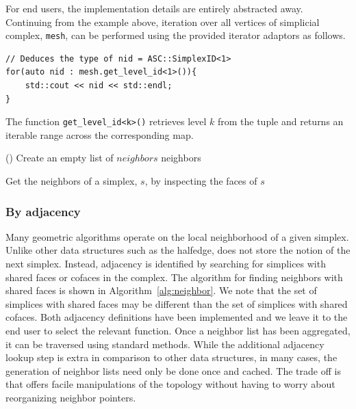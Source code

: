 		\par For end users, the implementation details are entirely abstracted away. Continuing from the example above, iteration over all vertices of simplicial complex, \verb|mesh|, can be performed using the provided iterator adaptors as follows.
\begin{lstlisting}[caption={Example use of iterator adaptors for traversal across vertices of mesh.},captionpos=b]
// Deduces the type of nid = ASC::SimplexID<1>
for(auto nid : mesh.get_level_id<1>()){
	std::cout << nid << std::endl;
}
\end{lstlisting}
		The function \verb|get_level_id<k>()| retrieves level $k$ from the tuple and returns an iterable range across the corresponding map.

\begin{algorithm}[ht!]


\SetStartEndCondition{ (}{)}{)}
\AlgoDisplayBlockMarkers\AlgoDisplayGroupMarkers\SetAlgoBlockMarkers{ \{}{ \}\ }%
\SetAlgoNoEnd\SetAlgoNoLine\DontPrintSemicolon
\SetStartEndCondition{ (}{)}{)}

\medskip
\Fn(){}{
	Create an empty list of $neighbors$\;
	\Return neighbors
}

\caption{Get the neighbors of a simplex, $s$, by inspecting the faces of $s$}
\label{alg:neighbor}
\end{algorithm}
	\subsubsection{By adjacency}
		\par Many geometric algorithms operate on the local neighborhood of a given simplex. Unlike other data structures such as the halfedge, \asc does not store the notion of the next simplex. Instead, adjacency is identified by searching for simplices with shared faces or cofaces in the complex. The algorithm for finding neighbors with shared faces is shown in Algorithm~\ref{alg:neighbor}. We note that the set of simplices with shared faces may be different than the set of simplices with shared cofaces. Both adjacency definitions have been implemented and we leave it to the end user to select the relevant function. Once a neighbor list has been aggregated, it can be traversed using standard methods. While the additional adjacency lookup step is extra in comparison to other data structures, in many cases, the generation of neighbor lists need only be done once and cached. The trade off is that \asc offers facile manipulations of the topology without having to worry about reorganizing neighbor pointers.

